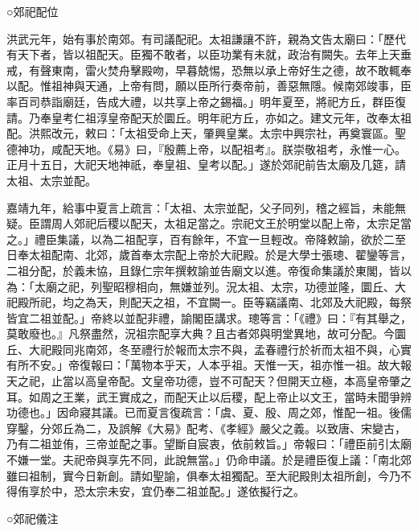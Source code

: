○郊祀配位

洪武元年，始有事於南郊。有司議配祀。太祖謙讓不許，親為文告太廟曰：「歷代有天下者，皆以祖配天。臣獨不敢者，以臣功業有未就，政治有闕失。去年上天垂戒，有聲東南，雷火焚舟擊殿吻，早暮兢惕，恐無以承上帝好生之德，故不敢輒奉以配。惟祖神與天通，上帝有問，願以臣所行奏帝前，善惡無隱。候南郊竣事，臣率百司恭詣廟廷，告成大禮，以共享上帝之錫福。」明年夏至，將祀方丘，群臣復請。乃奉皇考仁祖淳皇帝配天於圜丘。明年祀方丘，亦如之。建文元年，改奉太祖配。洪熙改元，敕曰：「太祖受命上天，肇興皇業。太宗中興宗社，再奠寰區。聖德神功，咸配天地。《易》曰，『殷薦上帝，以配祖考』。朕崇敬祖考，永惟一心。正月十五日，大祀天地神祇，奉皇祖、皇考以配。」遂於郊祀前告太廟及几筵，請太祖、太宗並配。

嘉靖九年，給事中夏言上疏言：「太祖、太宗並配，父子同列，稽之經旨，未能無疑。臣謂周人郊祀后稷以配天，太祖足當之。宗祀文王於明堂以配上帝，太宗足當之。」禮臣集議，以為二祖配享，百有餘年，不宜一旦輕改。帝降敕諭，欲於二至日奉太祖配南、北郊，歲首奉太宗配上帝於大祀殿。於是大學士張璁、翟鑾等言，二祖分配，於義未協，且錄仁宗年撰敕諭並告廟文以進。帝復命集議於東閣，皆以為：「太廟之祀，列聖昭穆相向，無嫌並列。況太祖、太宗，功德並隆，圜丘、大祀殿所祀，均之為天，則配天之祖，不宜闕一。臣等竊議南、北郊及大祀殿，每祭皆宜二祖並配。」帝終以並配非禮，諭閣臣講求。璁等言：「《禮》曰：『有其舉之，莫敢廢也。』凡祭盡然，況祖宗配享大典？且古者郊與明堂異地，故可分配。今圜丘、大祀殿同兆南郊，冬至禮行於報而太宗不與，孟春禮行於祈而太祖不與，心實有所不安。」帝復報曰：「萬物本乎天，人本乎祖。天惟一天，祖亦惟一祖。故大報天之祀，止當以高皇帝配。文皇帝功德，豈不可配天？但開天立極，本高皇帝肇之耳。如周之王業，武王實成之，而配天止以后稷，配上帝止以文王，當時未聞爭辨功德也。」因命寢其議。已而夏言復疏言：「虞、夏、殷、周之郊，惟配一祖。後儒穿鑿，分郊丘為二，及誤解《大易》配考、《孝經》嚴父之義。以致唐、宋變古，乃有二祖並侑，三帝並配之事。望斷自宸衷，依前敕旨。」帝報曰：「禮臣前引太廟不嫌一堂。夫祀帝與享先不同，此說無當。」仍命申議。於是禮臣復上議：「南北郊雖曰祖制，實今日新創。請如聖諭，俱奉太祖獨配。至大祀殿則太祖所創，今乃不得侑享於中，恐太宗未安，宜仍奉二祖並配。」遂依擬行之。

○郊祀儀注


